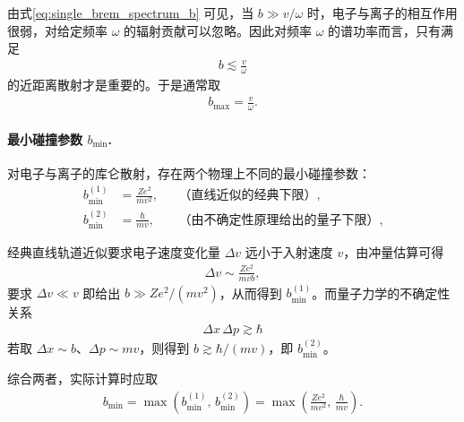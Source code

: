 \documentclass[12pt,oneside]{ctexart}
\theoremstyle{definition}
\theoremstyle{plain}
\theoremstyle{remark}
\begin{document}
由式\eqref{eq:single_brem_spectrum_b} 可见，当 $b\gg v/\omega$ 时，电子与离子的相互作用很弱，对给定频率 $\omega$ 的辐射贡献可以忽略。因此对频率 $\omega$ 的谱功率而言，只有满足
\begin{align}
  b \lesssim \frac{v}{\omega}
\end{align}
的近距离散射才是重要的。于是通常取
\begin{align}
  b_{\max} = \frac{v}{\omega}.
  \label{eq:bmax_def}
\end{align}

\paragraph{最小碰撞参数 $b_{\min}$.}

  对电子与离子的库仑散射，存在两个物理上不同的最小碰撞参数：
  \begin{align}
    b_{\min}^{(1)} &= \frac{Z e^{2}}{m v^{2}},
    &&\text{（直线近似的经典下限）},\\
    b_{\min}^{(2)} &= \frac{\hbar}{m v},
    &&\text{（由不确定性原理给出的量子下限）},
  \end{align}

经典直线轨道近似要求电子速度变化量 $\Delta v$ 远小于入射速度 $v$，由冲量估算可得
\begin{align}
  \Delta v \sim \frac{Z e^{2}}{m v b},
\end{align}
要求 $\Delta v \ll v$ 即给出 $b\gg Z e^{2}/(m v^{2})$，从而得到 $b_{\min}^{(1)}$。而量子力学的不确定性关系
\begin{align}
  \Delta x\,\Delta p \gtrsim \hbar
\end{align}
若取 $\Delta x\sim b$、$\Delta p\sim m v$，则得到 $b\gtrsim\hbar/(m v)$，即 $b_{\min}^{(2)}$。

综合两者，实际计算时应取
\begin{align}
  b_{\min}
  = \max\!\left(
      b_{\min}^{(1)},\,
      b_{\min}^{(2)}
    \right)
  = \max\!\left(
      \frac{Z e^{2}}{m v^{2}},\,
      \frac{\hbar}{m v}
    \right).
  \label{eq:bmin_final}
\end{align}
\end{document}
